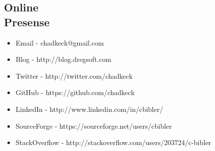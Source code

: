 \documentclass[margin]{res}
\begin{document}
\begin{resume}
\section{Online \\ Presense}
\begin{itemize} \itemsep -2pt  %

\item Email - chadkeck@gmail.com
\item Blog - http://blog.dregsoft.com
\item Twitter - http://twitter.com/chadkeck
\item GitHub - https://github.com/chadkeck
\item LinkedIn - http://www.linkedin.com/in/cbibler/
\item SourceForge - https://sourceforge.net/users/cbibler
\item StackOverflow - http://stackoverflow.com/users/203724/c-bibler
\end{itemize}






 
\end{resume} 
\end{document}
